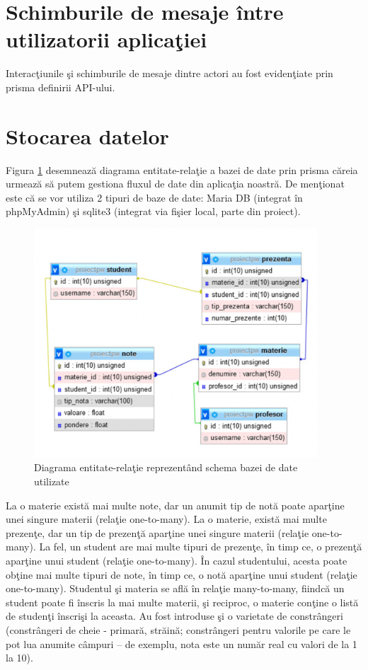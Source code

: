 \documentclass{report}
\begin{document}
\section{Schimburile de mesaje între utilizatorii aplica\c tiei}

Interac\c tiunile \c si schimburile de mesaje dintre actori au fost eviden\c tiate prin prisma definirii API-ului.

\section{Stocarea datelor}

Figura \ref{dbdgram} desemnează diagrama entitate-rela\c tie a bazei de date prin prisma căreia urmează să putem gestiona fluxul de date din aplica\c tia noastră.
De men\c tionat este că se vor utiliza 2 tipuri de baze de date: Maria DB (integrat în phpMyAdmin) \c si sqlite3 (integrat via fi\c sier local, parte din proiect).


\begin{figure}[h!]
    \centering
    \includegraphics[width=300pt]{img/dbdgram.png}
    \caption{Diagrama entitate-rela\c tie reprezentând schema bazei de date utilizate}
    \label{dbdgram}
\end{figure}



La o materie există mai multe note, dar un anumit tip de notă poate apar\c tine unei singure materii (rela\c tie one-to-many). La o materie, există mai multe prezen\c te, dar un tip de prezen\c tă apar\c tine unei singure materii (rela\c tie one-to-many). La fel, un student are mai multe tipuri de prezen\c te, în timp ce, o prezen\c tă apar\c tine unui student (rela\c tie one-to-many). În cazul studentului, acesta poate ob\c tine mai multe tipuri de note, în timp ce, o notă apar\c tine unui student (rela\c tie one-to-many). Studentul \c si materia se află în rela\c tie many-to-many, fiindcă un student poate fi înscris la mai multe materii, \c si reciproc, o materie con\c tine o listă de studen\c ti înscri\c si la aceasta.
Au fost introduse \c si o varietate de constrângeri (constrângeri de cheie - primară, străină; constrângeri pentru valorile pe care le pot lua anumite câmpuri – de exemplu, nota este un număr real cu valori de la 1 la 10).
\newpage 
\end{document}
